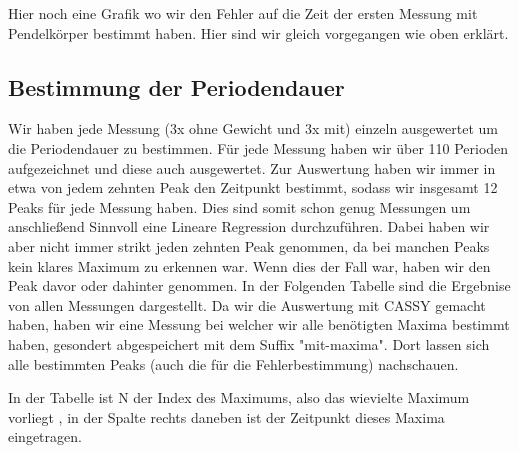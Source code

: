 \documentclass[twoside]{protokoll}
\begin{document}
Hier noch eine Grafik wo wir den Fehler auf die Zeit der ersten Messung mit Pendelkörper bestimmt haben. 
Hier sind wir gleich vorgegangen wie oben erklärt. 

\subsection{Bestimmung der Periodendauer}
Wir haben jede Messung (3x ohne Gewicht und 3x mit) einzeln ausgewertet um die Periodendauer zu bestimmen.
Für jede Messung haben wir über 110 Perioden aufgezeichnet und diese auch ausgewertet. 
Zur Auswertung haben wir immer in etwa von jedem zehnten Peak den Zeitpunkt bestimmt, sodass wir insgesamt 12 Peaks für jede Messung haben.
Dies sind somit schon genug Messungen um anschließend Sinnvoll eine Lineare Regression durchzuführen.
Dabei haben wir aber nicht immer strikt jeden zehnten Peak genommen, da bei manchen Peaks kein klares Maximum zu erkennen war.
Wenn dies der Fall war, haben wir den Peak davor oder dahinter genommen.
In der Folgenden Tabelle sind die Ergebnise von allen Messungen dargestellt.
Da wir die Auswertung mit CASSY gemacht haben, haben wir eine Messung bei welcher wir alle benötigten Maxima bestimmt haben, gesondert abgespeichert mit dem Suffix "mit-maxima".
Dort lassen sich alle bestimmten Peaks (auch die für die Fehlerbestimmung) nachschauen.

In der Tabelle ist N der Index des Maximums, also das wievielte Maximum vorliegt , in der Spalte rechts daneben ist der Zeitpunkt dieses Maxima eingetragen.
\end{document}
